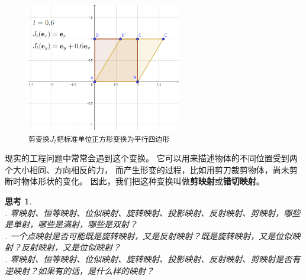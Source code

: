 \documentclass[12pt,UTF8]{ctexbook}
\newtheorem{sk}{思考}[section]
\begin{document}
\begin{figure}[h]
    \vspace{4pt}
    \centering
    \includegraphics[width=0.6\textwidth]{剪变换1.png}
    \captionsetup{justification=centering}
    \caption*{\texttt{剪变换}$J_t$\texttt{把\textcolor[RGB]{162,69,22}{标准单位正方形}变换为\textcolor[RGB]{218,183,74}{平行四边形}}}

\end{figure}

现实的工程问题中常常会遇到这个变换。
它可以用来描述物体的不同位置受到两个大小相同、方向相反的力，
而产生形变的过程，比如用剪刀裁剪物体，尚未剪断时物体形状的变化。
因此，我们把这种变换叫做\textbf{剪映射}或\textbf{错切映射}。


\begin{sk}
    \mbox{} \\
    . 零映射、恒等映射、位似映射、旋转映射、投影映射、反射映射、剪映射，哪些是单射，哪些是满射，哪些是双射？\\
    . 一个点映射是否可能既是旋转映射，又是反射映射？既是旋转映射，又是位似映射？反射映射，又是位似映射？\\
    . 零映射、恒等映射、位似映射、旋转映射、投影映射、反射映射、剪映射是否有逆映射？如果有的话，是什么样的映射？
\end{sk}
\end{document}
